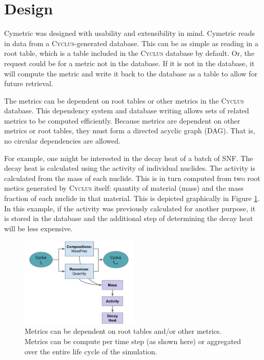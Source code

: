 \documentclass{anstrans}
\newcommand{\cyclus}{\textsc{Cyclus}\xspace}
\begin{document}
\section{Design}
Cymetric was designed with usability and extensibility in mind. 
Cymetric reads in data from a \cyclus{}-generated database. This can be as 
simple as reading in a root table, which is a table included in the \cyclus 
database by default. Or, the request could be for a metric not in the database.
If it is not in the database, it will compute the metric and 
write it back to the database as a table to allow for future retrieval. 

The metrics can be dependent on root tables or other metrics in the
\cyclus database. This dependency system and database writing allows sets of 
related metrics to be computed efficiently. Because metrics are dependent 
on other metrics or root tables, they must form a directed 
acyclic graph (DAG). That is, no circular dependencies are allowed.

For example, one might be interested in the decay heat 
of a batch of \gls{SNF}. The decay heat is calculated using the activity of 
individual nuclides. The activity is calculated from the mass of each nuclide.
This is in turn computed from two root metics generated by 
\cyclus itself: quantity of material (mass) and the mass fraction of each 
nuclide in that material. 
This is depicted graphically in Figure \ref{fig:metdeps}. In this example, 
if the activity was previously calculated for another purpose, it is stored in the database and the additional step of 
determining the decay heat will be less expensive. 

\begin{figure}[htbp!]
\begin{center}
\includegraphics[width=0.5\textwidth]{deps.pdf}
\end{center}
\caption{Metrics can be dependent on root tables and/or other metrics.
         Metrics can be compute per time step (as shown here) or aggregated
         over the entire life cycle of the simulation.}
\label{fig:metdeps}
\end{figure}
\end{document}

